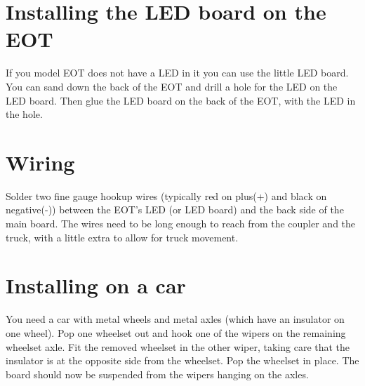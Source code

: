 \documentclass[12pt,twoside,letterpaper]{article}
\begin{document}
\section{Installing the LED board on the EOT}

If you model EOT does not have a LED in it you can use the little LED board. 
You can sand down the back of the EOT and drill a hole for the LED on the LED 
board.  Then glue the LED board on the back of the EOT, with the LED in the 
hole.

\section{Wiring}

Solder two fine gauge hookup wires (typically red on plus(+) and black on 
negative(-)) between the EOT's LED (or LED board) and the back side of the 
main board.  The wires need to be long enough to reach from the coupler and 
the truck, with a little extra to allow for truck movement.

\section{Installing on a car}

You need a car with metal wheels and metal axles (which have an insulator on 
one wheel).  Pop one wheelset out and hook one of the wipers on the remaining 
wheelset axle.  Fit the removed wheelset in the other wiper, taking care that 
the insulator is at the opposite side from the wheelset.  Pop the wheelset in 
place.  The board should now be suspended from the wipers hanging on the 
axles. 
\end{document}

